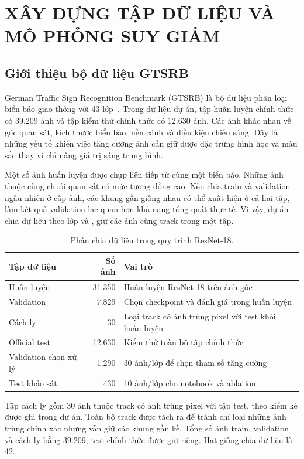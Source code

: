 \section{XÂY DỰNG TẬP DỮ LIỆU VÀ MÔ PHỎNG SUY GIẢM}
\subsection{Giới thiệu bộ dữ liệu GTSRB}
German Traffic Sign Recognition Benchmark (GTSRB) là bộ dữ liệu phân loại biển báo giao thông với 43 lớp~\cite{gtsrb}. Trong dữ liệu dự án, tập huấn luyện chính thức có 39.209 ảnh và tập kiểm thử chính thức có 12.630 ảnh. Các ảnh khác nhau về góc quan sát, kích thước biển báo, nền cảnh và điều kiện chiếu sáng. Đây là những yếu tố khiến việc tăng cường ảnh cần giữ được đặc trưng hình học và màu sắc thay vì chỉ nâng giá trị sáng trung bình.

Một số ảnh huấn luyện được chụp liên tiếp từ cùng một biển báo. Những ảnh thuộc cùng chuỗi quan sát có mức tương đồng cao. Nếu chia train và validation ngẫu nhiên ở cấp ảnh, các khung gần giống nhau có thể xuất hiện ở cả hai tập, làm kết quả validation lạc quan hơn khả năng tổng quát thực tế. Vì vậy, dự án chia dữ liệu theo lớp và , giữ các ảnh cùng track trong một tập.

\begin{table}[htbp]
\centering
\caption{Phân chia dữ liệu trong quy trình ResNet-18.}
\begin{tabular}{P{4.0cm}rP{7.3cm}}
\toprule
Tập dữ liệu & Số ảnh & Vai trò \\
\midrule
Huấn luyện & 31.350 & Huấn luyện ResNet-18 trên ảnh gốc \\
Validation & 7.829 & Chọn checkpoint và đánh giá trong huấn luyện \\
Cách ly & 30 & Loại track có ảnh trùng pixel với test khỏi huấn luyện \\
Official test & 12.630 & Kiểm thử toàn bộ tập chính thức \\
Validation chọn xử lý & 1.290 & 30 ảnh/lớp để chọn tham số tăng cường \\
Test khảo sát & 430 & 10 ảnh/lớp cho notebook và ablation \\
\bottomrule
\end{tabular}
\label{tab:splits}
\end{table}

Tập cách ly gồm 30 ảnh thuộc track có ảnh trùng pixel với tập test, theo kiểm kê được ghi trong dự án. Toàn bộ track được tách ra để tránh chỉ loại những ảnh trùng chính xác nhưng vẫn giữ các khung gần kề. Tổng số ảnh train, validation và cách ly bằng 39.209; test chính thức được giữ riêng. Hạt giống chia dữ liệu là 42.

